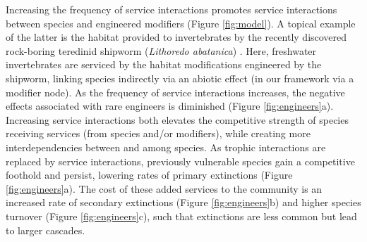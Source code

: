 \documentclass[twocolumn,preprintnumbers,amsmath,amssymb,superscriptaddress,linenumbers]{revtex4-1}
\begin{document}
Increasing the frequency of service interactions promotes service interactions between species and engineered modifiers (Figure \ref{fig:model}).
A topical example of the latter is the habitat provided to invertebrates by the recently discovered rock-boring teredinid shipworm (\emph{Lithoredo abatanica}) \cite{Shipway2019}.
Here, freshwater invertebrates are serviced by the habitat modifications engineered by the shipworm, linking species indirectly via an abiotic effect (in our framework via a modifier node).
As the frequency of service interactions increases, the negative effects associated with rare engineers is diminished (Figure \ref{fig:engineers}a).
Increasing service interactions both elevates the competitive strength of species receiving services (from species and/or modifiers), while creating more interdependencies between and among species.
As trophic interactions are replaced by service interactions, previously vulnerable species gain a competitive foothold and persist, lowering rates of primary extinctions (Figure \ref{fig:engineers}a). %
The cost of these added services to the community is an increased rate of secondary extinctions (Figure \ref{fig:engineers}b) and higher species turnover (Figure \ref{fig:engineers}c), such that extinctions are less common but lead to larger cascades.



\end{document}
